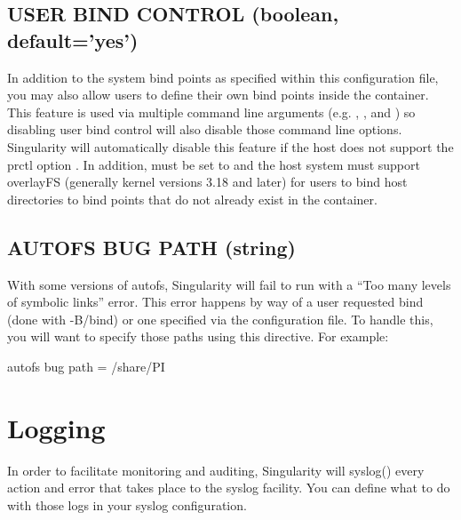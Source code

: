 \documentclass[letterpaper,10pt,english]{sphinxmanual}
\begin{document}
\subsection{USER BIND CONTROL (boolean, default=’yes’)}
\label{\detokenize{the_singularity_config_file:user-bind-control-boolean-default-yes}}
In addition to the system bind points as specified within this
configuration file, you may also allow users to define their own bind
points inside the container. This feature is used via multiple command
line arguments (e.g. ,  , and ) so disabling user bind control will
also disable those command line options.
Singularity will automatically disable this feature if the host does
not support the prctl option . In addition,  must be set to  and the
host system must support overlayFS (generally kernel versions 3.18 and
later) for users to bind host directories to bind points that do not
already exist in the container.


\subsection{AUTOFS BUG PATH (string)}
\label{\detokenize{the_singularity_config_file:autofs-bug-path-string}}
With some versions of autofs, Singularity will fail to run with a “Too
many levels of symbolic links” error. This error happens by way of a
user requested bind (done with -B/\textendash{}bind) or one specified via the
configuration file. To handle this, you will want to specify those
paths using this directive. For example:

%
\begin{sphinxVerbatim}[commandchars=\\\{\}]
autofs bug path = /share/PI
\end{sphinxVerbatim}


\section{Logging}
\label{\detokenize{the_singularity_config_file:logging}}
In order to facilitate monitoring and auditing, Singularity will
syslog() every action and error that takes place to the  syslog facility.
You can define what to do with those logs in your syslog configuration.
\end{document}
